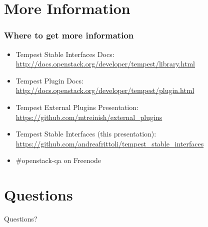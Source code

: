 \documentclass[aspectratio=169,11pt,hyperref={colorlinks=true}]{beamer}
\begin{document}
\section{More Information}
\begin{frame}
\frametitle{Where to get more information}
    \begin{itemize}
        \item Tempest Stable Interfaces Docs: \href{http://docs.openstack.org/developer/tempest/library.html}{http://docs.openstack.org/developer/tempest/library.html}
        \item Tempest Plugin Docs: \href{http://docs.openstack.org/developer/tempest/plugin.html}{http://docs.openstack.org/developer/tempest/plugin.html}
        \item Tempest External Plugins Presentation: \href{https://github.com/mtreinish/external_plugins}{https://github.com/mtreinish/external\_plugins}
        \item Tempest Stable Interfaces (this presentation): \href{https://github.com/andreafrittoli/tempest_stable_interfaces}{https://github.com/andreafrittoli/tempest\_stable\_interfaces}
        \item \#openstack-qa on Freenode
    \end{itemize}
\end{frame}

\section{Questions}
\begin{frame}[c]
    \begin{center}
        \Huge Questions?
    \end{center}
\end{frame}

\end{document}
